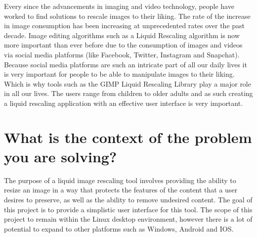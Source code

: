 \documentclass[a4paper]{article}
\begin{document}
Every since the advancements in imaging and video technology, people have worked to find solutions to rescale images to their liking. The rate of the increase in image consumption has been increasing at unprecedented rates over the past decade. Image editing algorithms such as a Liquid Rescaling algorithm is now more important than ever before due to the consumption of images and videos via social media platforms (like Facebook, Twitter, Instagram and Snapchat). Because social media platforms are such an intricate part of all our daily lives it is very important for people to be able to manipulate images to their liking. Which is why tools such as the GIMP Liquid Rescaling Library play a major role in all our lives. The users range from children to older adults and as such creating a liquid rescaling application with an effective user interface is very important.

\section{What is the context of the problem you are solving?}

The purpose of a liquid image rescaling tool involves providing the ability to resize an image in a
way that protects the features of the content that a user desires to preserve, as well as the
ability to remove undesired content. The goal of this project is to provide a simplistic user
interface for this tool. The scope of this project to remain within the Linux desktop
environment, however there is a lot of potential to expand to other platforms such as Windows, Android and IOS.
\end{document}
